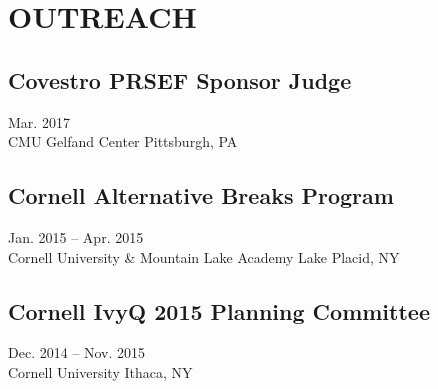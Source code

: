 \documentclass[]{article}
\begin{document}
\section*{OUTREACH} 

\subsection*{Covestro PRSEF Sponsor Judge} \hfill Mar. 2017\\
CMU Gelfand Center \hfill Pittsburgh, PA

\subsection*{Cornell Alternative Breaks Program} \hfill Jan. 2015 -- Apr. 2015 \\
Cornell University \& Mountain Lake Academy \hfill Lake Placid, NY 

\subsection*{Cornell IvyQ 2015 Planning Committee} \hfill Dec. 2014 -- Nov. 2015\\
Cornell University \hfill Ithaca, NY


\theendnotes
\end{document}
